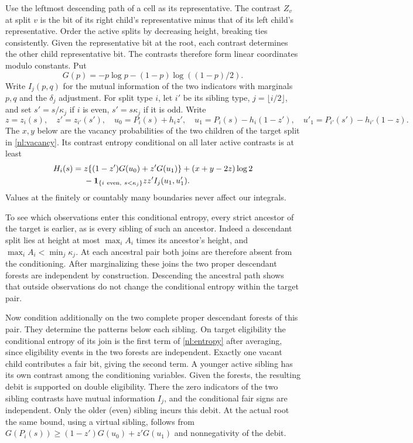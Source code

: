 \documentclass[11pt]{article}
\numberwithin{equation}{section}
\newcommand{\one}{\mathbf 1}
\begin{document}
Use the leftmost descending path of a cell as its representative.
The contrast $Z_v$ at split $v$ is the bit of its right child's
representative minus that of its left child's representative.
Order the active splits by decreasing height, breaking ties
consistently. Given the representative bit at the root, each
contrast determines the other child representative bit. The
contrasts therefore form linear coordinates modulo constants. Put
\[
 G(p)=-p\log p-(1-p)\log((1-p)/2).
\]
Write $I_j(p,q)$ for the mutual information of the two indicators
with marginals $p,q$ and the $\delta_j$ adjustment. For split type
$i$, let $i'$ be its sibling type, $j=\lfloor i/2\rfloor$, and set
$s'=s/\kappa_j$ if $i$ is even, $s'=s\kappa_j$ if it is odd. Write
\[
 z=z_i(s),\quad z'=z_{i'}(s'),\quad
 u_0=P_i(s)+h_i z',\quad
 u_1=P_i(s)-h_i(1-z'),\quad
 u'_1=P_{i'}(s')-h_{i'}(1-z).
\]
The $x,y$ below are the vacancy probabilities of the two children
of the target split in \eqref{nl:vacancy}. Its contrast entropy
conditional on all later active contrasts is at least
\begin{align}
 H_i(s)={}&z\{(1-z')G(u_0)+z'G(u_1)\}
                   +(x+y-2z)\log2  \notag\\
          &-\one_{\{i\ {\rm even},\ s<\kappa_j\}}
                   zz'I_j(u_1,u'_1).
 \label{nl:entropy}
\end{align}
Values at the finitely or countably many boundaries never affect
our integrals.

To see which observations enter this conditional entropy, every
strict ancestor of the target is earlier, as is every sibling of
such an ancestor. Indeed a descendant split lies at height at most
$\max_i A_i$ times its ancestor's height, and $\max_i A_i<\min_j
\kappa_j$. At each ancestral pair both joins are therefore absent
from the conditioning. After marginalizing these joins the two
proper descendant forests are independent by construction. Descending
the ancestral path shows that outside observations do not change the
conditional entropy within the target pair.

Now condition additionally on the two complete proper descendant
forests of this pair. They determine the patterns below each
sibling. On target eligibility the conditional entropy of its join
is the first term of \eqref{nl:entropy} after averaging, since
eligibility events in the two forests are independent. Exactly one
vacant child contributes a fair bit, giving the second term. A
younger active sibling has its own contrast among the conditioning
variables. Given the forests, the resulting debit is supported on
double eligibility. There the zero indicators of the two sibling contrasts have mutual
information $I_j$, and the conditional fair signs are independent.
Only the older (even) sibling incurs this debit. At the actual root
the same bound, using a virtual sibling, follows from
$G(P_i(s))\ge(1-z')G(u_0)+z'G(u_1)$ and nonnegativity of the debit.
\end{document}
